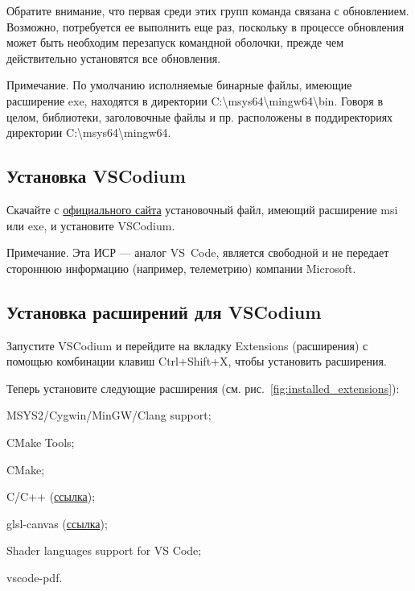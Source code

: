 \documentclass[a4paper,12pt]{article}
\renewenvironment{itemize}{
    \begin{list}{\labelitemi}{
    \setlength{\topsep}{0pt}
    \setlength{\partopsep}{6pt}
    \setlength{\parskip}{0pt}
    \setlength{\itemsep}{0pt}
    \setlength{\parsep}{0pt}
    }
}{\end{list}}
\begin{document}

Обратите внимание, что первая среди этих групп команда связана с обновлением. Возможно, потребуется ее выполнить еще раз, поскольку в процессе обновления может быть необходим перезапуск командной оболочки, прежде чем действительно установятся все обновления.



Примечание.
По умолчанию исполняемые бинарные файлы, имеющие расширение exe, находятся в директории \textquotedbl C:\textbackslash msys64\textbackslash mingw64\textbackslash bin\textquotedbl. Говоря в целом, библиотеки, заголовочные файлы и пр. расположены в поддиректориях директории \textquotedbl C:\textbackslash msys64\textbackslash mingw64\textquotedbl.

\subsection{Установка VSCodium}

Скачайте с \href{https://github.com/VSCodium/vscodium/releases/}{официального сайта} установочный файл, имеющий расширение msi или exe, и установите VSCodium.

Примечание.
Эта ИСР --- аналог VS~Code, является свободной и не передает стороннюю информацию (например, телеметрию) компании Microsoft.

\subsection{Установка расширений для VSCodium}

Запустите VSCodium и перейдите на вкладку Extensions (расширения) с помощью комбинации клавиш Ctrl+Shift+X, чтобы установить расширения.

Теперь установите следующие расширения (см. рис.~\ref{fig:installed_extensions}):

\begin{itemize}
	\item MSYS2/Cygwin/MinGW/Clang support;
	\item CMake Tools;
	\item CMake;
	\item C/C++ (\href{https://marketplace.visualstudio.com/items?itemName=ms-vscode.cpptools}{ссылка});
	\item glsl-canvas (\href{https://marketplace.visualstudio.com/items?itemName=circledev.glsl-canvas}{ссылка});
	\item Shader languages support for VS Code;
	\item vscode-pdf.
\end{itemize}
\end{document}
